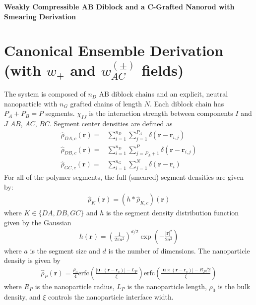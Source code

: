 \documentclass{article}
\begin{document}
\begin{center}
  \textbf{Weakly Compressible AB Diblock and a C-Grafted Nanorod with
  Smearing Derivation}
\end{center}

\section{Canonical Ensemble Derivation (with $w_+$ and $w_{AC}^{(\pm)}$ fields)}

The system is composed of $n_D$ AB diblock chains and an explicit, neutral
  nanoparticle with $n_G$ grafted chains of length $N$.
Each diblock chain has $P_A + P_B = P$ segments.
$\chi_{IJ}$ is the interaction strength between components $I$ and $J$
  $AB$, $AC$, $BC$.
Segment center densities are defined as
\begin{align*}
  \hat{\rho}_{DA,c} (\mathbf{r}) =&
    \sum_{i=1}^{n_D} \sum_{j=1}^{P_A}
    \delta(\mathbf{r} - \mathbf{r}_{i,j}) \\
  \hat{\rho}_{DB,c} (\mathbf{r}) =&
    \sum_{i=1}^{n_D} \sum_{j=P_A+1}^{P}
    \delta(\mathbf{r} - \mathbf{r}_{i,j}) \\
  \hat{\rho}_{GC,c} (\mathbf{r}) =&
    \sum_{i=1}^{n_G} \sum_{j=1}^{N}
    \delta(\mathbf{r} - \mathbf{r}_i)
\end{align*}
For all of the polymer segments, the full (smeared) segment densities are given
  by:
\begin{align*}
  \hat{\rho}_K(\mathbf{r}) = (h \ast \hat{\rho}_{K,c})(\mathbf{r})
\end{align*}
where $K \in \{ DA, DB, GC\}$ and $h$ is the segment density distribution
  function given by the Gaussian
\begin{align*}
  h(\mathbf{r}) = \left( \frac{1}{2\pi a^2} \right)^{d/2}
  \exp \left( - \frac{|\mathbf{r}|^2}{2a^2}  \right)
\end{align*}
where $a$ is the segment size and $d$ is the number of dimensions.
The nanoparticle density is given by
\begin{align*}
  \hat{\rho}_P(\mathbf{r}) =
    \frac{\rho_0}{4}
    \textrm{erfc} \left(
      \frac{|\mathbf{u} \cdot (\mathbf{r} - \mathbf{r}_c)| - L_P}{\xi} 
    \right)
    \textrm{erfc} \left(
      \frac{|\mathbf{u} \times (\mathbf{r} - \mathbf{r}_c)| - R_P/2}{\xi}       
    \right)
\end{align*}
where $R_P$ is the nanoparticle radius, $L_P$ is the nanoparticle length, $\rho_0$ is the bulk density,
  and $\xi$ controls the nanoparticle interface width.
\end{document}
